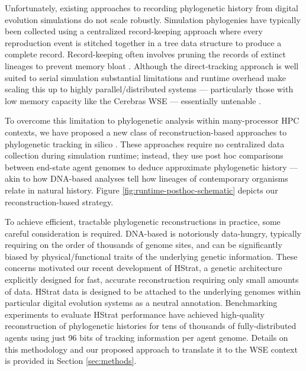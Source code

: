 Unfortunately, existing approaches to recording phylogenetic history from digital evolution simulations do not scale robustly.
Simulation phylogenies have typically been collected using a centralized record-keeping approach where every reproduction event is stitched together in a tree data structure to produce a complete record.
Record-keeping often involves pruning the records of extinct lineages to prevent memory bloat \citep{dolson2023phylotrack}.
Although the direct-tracking approach is well suited to serial simulation substantial limitations and runtime overhead make scaling this up to highly parallel/distributed systems --- particularly those with low memory capacity like the Cerebras WSE --- essentially untenable \citep{moreno2024analysis}.

To overcome this limitation to phylogenetic analysis within many-processor HPC contexts, we have proposed a new class of reconstruction-based approaches to phylogenetic tracking in silico \citep{moreno2022hereditary}.
These approaches require no centralized data collection during simulation runtime; instead, they use post hoc comparisons between end-state agent genomes to deduce approximate phylogenetic history --- akin to how DNA-based analyses tell how lineages of contemporary organisms relate in natural history.
Figure \ref{fig:runtime-posthoc-schematic} depicts our reconstruction-based strategy.

To achieve efficient, tractable phylogenetic reconstructions in practice, some careful consideration is required.
DNA-based is notoriously data-hungry, typically requiring on the order of thousands of genome sites, and can be significantly biased by physical/functional traits of the underlying genetic information.
These concerns motivated our recent development of HStrat, a genetic architecture explicitly designed for fast, accurate reconstruction requiring only small amounts of data.
HStrat data is designed to be attached to the underlying genomes within particular digital evolution systems as a neutral annotation.
Benchmarking experiments to evaluate HStrat performance have achieved high-quality reconstruction of phylogenetic histories for tens of thousands of fully-distributed agents using just 96 bits of tracking information per agent genome.
Details on this methodology and our proposed approach to translate it to the WSE context is provided in Section \ref{sec:methods}.


